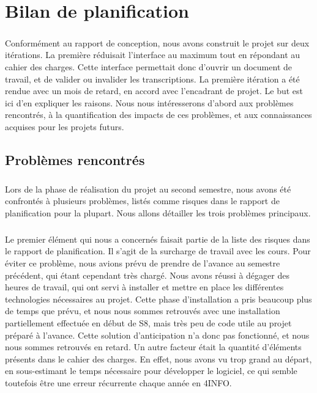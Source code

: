 \chapter{Bilan de planification}

\paragraph{}
Conformément au rapport de conception, nous avons construit le projet sur deux itérations. La première réduisait l'interface au maximum tout en répondant au cahier des charges. Cette interface permettait donc d'ouvrir un document de travail, et de valider ou invalider les transcriptions. La première itération a été rendue avec un mois de retard, en accord avec l'encadrant de projet. Le but est ici d'en expliquer les raisons. Nous nous intéresserons d'abord aux problèmes rencontrés, à la quantification des impacts de ces problèmes, et aux connaissances acquises pour les projets futurs.

\section{Problèmes rencontrés}

\paragraph{}
Lors de la phase de réalisation du projet au second semestre, nous avons été confrontés à plusieurs problèmes, listés comme risques dans le rapport de planification pour la plupart. Nous allons détailler les trois problèmes principaux.

\paragraph{}
Le premier élément qui nous a concernés faisait partie de la liste des risques dans le rapport de planification. Il s'agit de la surcharge de travail avec les cours. Pour éviter ce problème, nous avions prévu de prendre de l'avance au semestre précédent, qui étant cependant très chargé. Nous avons réussi à dégager des heures de travail, qui ont servi à installer et mettre en place les différentes technologies nécessaires au projet. Cette phase d'installation a pris beaucoup plus de temps que prévu, et nous nous sommes retrouvés avec une installation partiellement effectuée en début de S8, mais très peu de code utile au projet préparé à l'avance. Cette solution d'anticipation n'a donc pas fonctionné, et nous nous sommes retrouvés en retard. Un autre facteur était la quantité d'éléments présents dans le cahier des charges. En effet, nous avons vu trop grand au départ, en sous-estimant le temps nécessaire pour développer le logiciel, ce qui semble toutefois être une erreur récurrente chaque année en 4INFO.

